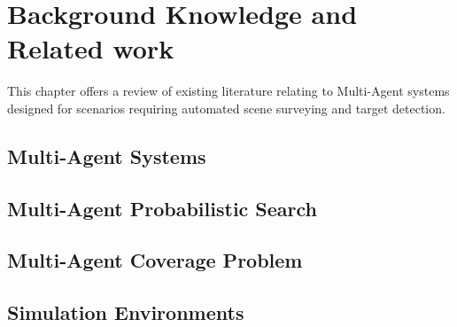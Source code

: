 

\chapter{Background Knowledge and Related work}

\workinprogress
\newline

This chapter offers a review of existing literature relating to Multi-Agent systems designed for scenarios requiring automated scene surveying and target detection. 


\section{Multi-Agent Systems}


\section{Multi-Agent Probabilistic Search}


\section{Multi-Agent Coverage Problem}


\section{Simulation Environments}


